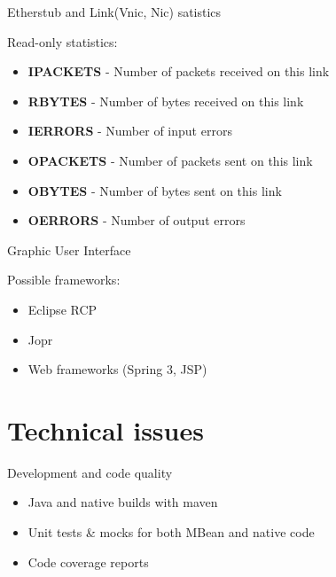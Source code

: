\documentclass{beamer}
\begin{document}
		\begin{frame}{Etherstub and Link(Vnic, Nic) satistics }

			Read-only statistics:
			
			\begin{itemize}

				\item \textbf{IPACKETS} - Number of packets received on this link
				\item \textbf{RBYTES} - Number of bytes received on this link
				\item \textbf{IERRORS} - Number of input errors
				\item \textbf{OPACKETS} - Number of packets sent on this link
				\item \textbf{OBYTES} - Number of bytes sent on this link
				\item \textbf{OERRORS} - Number of output errors
			
			\end{itemize}

		\end{frame}

		\begin{frame}{Graphic User Interface}

			\begin{center}
				Possible frameworks:
				\begin{itemize}
					\item Eclipse RCP
					\item Jopr
					\item Web frameworks (Spring 3, JSP)
				
				\end{itemize}
			\end{center}
		\end{frame}


\section{Technical issues}

	\begin{frame}{Development and code quality}

		\begin{itemize}
			\item Java and native builds with maven
			\item Unit tests \& mocks for both MBean and native code
			\item Code coverage reports
		\end{itemize}
	
	\end{frame}
\end{document}
